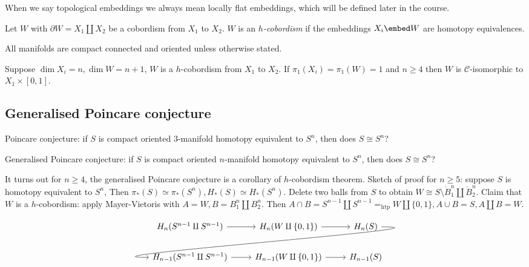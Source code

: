 \documentclass[a4paper]{article}
\renewcommand{\boundary}{\partial}
\newcommand{\interior}{\ocirc}
\begin{document}
\begin{convention}
  When we say topological embeddings we always mean locally flat embeddings, which will be defined later in the course.
\end{convention}

\begin{definition}[\(h\)-cobordism]
  Let \(W\) with \(\boundary W = X_1 \amalg X_2\) be a cobordism from \(X_1\) to \(X_2\). \(W\) is an \emph{\(h\)-cobordism} if the embeddings \(X_i \embed W\) are homotopy equivalences.
\end{definition}

\begin{convention}
  All manifolds are compact connected and oriented unless otherwise stated.
\end{convention}

\begin{theorem}[\(h\)-cobordism]
  Suppose \(\dim X_i = n, \dim W = n + 1\), \(W\) is a \(h\)-cobordism from \(X_1\) to \(X_2\). If \(\pi_1(X_i) = \pi_1(W) = 1\) and \(n \geq 4\) then \(W\) is \(\mathcal C\)-isomorphic to \(X_1 \times [0, 1]\).
\end{theorem}

\subsection{Generalised Poincare conjecture}

Poincare conjecture: if \(S\) is compact oriented \(3\)-manifold homotopy equivalent to \(S^n\), then does \(S \cong S^n\)?

Generalised Poincare conjecture: if \(S\) is compact oriented \(n\)-manifold homotopy equivalent to \(S^n\), then does \(S \cong S^n\)?

It turns out for \(n \geq 4\), the generalised Poincare conjecture is a corollary of \(h\)-cobordism theorem. Sketch of proof for \(n \geq 5\): suppose \(S\) is homotopy equivalent to \(S^n\), Then \(\pi_*(S) \simeq \pi_*(S^n), H_*(S) \simeq H_*(S^n)\). Delete two balls from \(S\) to obtain \(W \cong S \setminus \interior B_1^n \amalg \interior B_2^n\). Claim that \(W\) is a \(h\)-cobordism: apply Mayer-Vietoris with \(A = W, B = B_1^n \amalg B_2^n\). Then \(A \cap B = S^{n - 1} \amalg S^{n - 1} =_{\text{htp}} W \amalg \{0, 1\}, A \cup B = S, A \amalg B = W \).

\[
  \begin{tikzcd}
    H_n(S^{n - 1} \amalg S^{n - 1}) \ar[r] & H_n(W \amalg \{0, 1\}) \ar[r] & H_n(S) \ar[dll, out=0, in=180] \\
    H_{n - 1}(S^{n - 1} \amalg S^{n - 1}) \ar[r] & H_{n - 1}(W \amalg \{0, 1\}) \ar[r] & H_{n - 1}(S)
  \end{tikzcd}
\]
\end{document}
